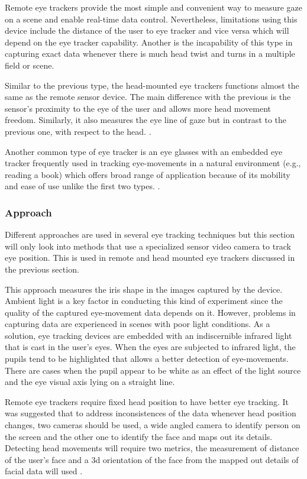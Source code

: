 \documentclass[journal]{./IEEE/IEEEtran}
\begin{document}
Remote eye trackers provide the most simple and convenient way to measure gaze on a scene and enable real-time data control. Nevertheless, limitations using this device include the distance of the user to eye tracker and vice versa which will depend on the eye tracker capability. Another is the incapability of  this type in capturing exact data whenever there is much head twist and turns in a multiple field or scene.

Similar to the previous type, the head-mounted eye trackers functions almost the same as the remote sensor device. The main difference with the previous is the sensor’s proximity to the eye of the user and allows more head movement freedom. Similarly, it also measures the eye line of gaze but in contrast to the previous one, with respect to the head. \cite {choosing_an_eye_trackingSB}.

Another common type of eye tracker is an eye glasses with an embedded eye tracker frequently used in tracking eye-movements in a natural environment (e.g., reading a book) which offers broad range of application because of its mobility and ease of use unlike the first two types. \cite {choosing_an_eye_trackingSB}.


\subsubsection{Approach} \leavevmode

Different approaches are used in several eye tracking techniques but this section will only look into methods  that use a specialized sensor video camera to track eye position. This is used in remote and head mounted eye trackers discussed in the previous section.

This approach measures the iris shape in the images captured by the device. Ambient light is a key factor in conducting this kind of experiment since the quality of the captured eye-movement data depends on it. However, problems in capturing data are experienced in scenes with poor light conditions. As a solution, eye tracking devices are embedded with an indiscernible infrared light that is cast  in the user’s eyes. When the eyes are subjected to infrared light, the pupils tend to be highlighted that allows a better detection of eye-movements. There are cases when the pupil appear to be white as an effect of the light source and the eye visual axis lying on a straight line. 

Remote eye trackers require fixed head position to have better eye tracking. It was suggested that to address inconsistences of the data whenever head position changes, two cameras should be used, a wide angled camera to identify person on the screen and the other one to identify the face and maps out its details. Detecting head movements will require two metrics, the measurement of distance of the user’s face and a 3d orientation of the face from the mapped out details of facial data will used \cite {lupu_ungureanu}.
\end{document}
